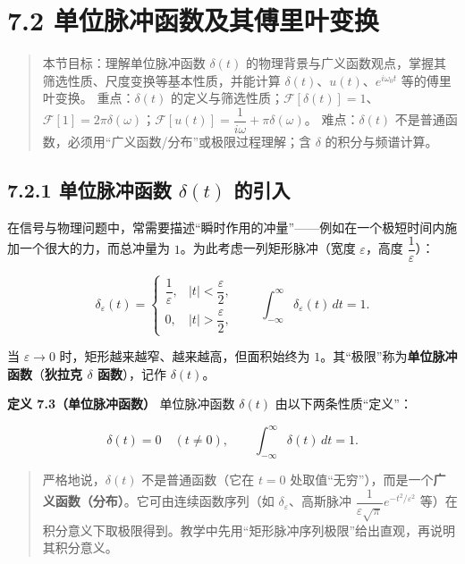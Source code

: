 \section{7.2
单位脉冲函数及其傅里叶变换}\label{ux5355ux4f4dux8109ux51b2ux51fdux6570ux53caux5176ux5085ux91ccux53f6ux53d8ux6362}

\begin{quote}
本节目标：理解单位脉冲函数 \(\delta(t)\)
的物理背景与广义函数观点，掌握其筛选性质、尺度变换等基本性质，并能计算
\(\delta(t)\)、\(u(t)\)、\(e^{i\omega_0 t}\) 等的傅里叶变换。
重点：\(\delta(t)\)
的定义与筛选性质；\(\mathcal F[\delta(t)]=1\)、\(\mathcal F[1]=2\pi\delta(\omega)\)；\(\mathcal F[u(t)]=\dfrac{1}{i\omega}+\pi\delta(\omega)\)。
难点：\(\delta(t)\)
不是普通函数，必须用``广义函数/分布''或极限过程理解；含 \(\delta\)
的积分与频谱计算。
\end{quote}

\subsection{\texorpdfstring{7.2.1 单位脉冲函数 \(\delta(t)\)
的引入}{7.2.1 单位脉冲函数 \textbackslash delta(t) 的引入}}\label{ux5355ux4f4dux8109ux51b2ux51fdux6570-deltat-ux7684ux5f15ux5165}

在信号与物理问题中，常需要描述``瞬时作用的冲量''------例如在一个极短时间内施加一个很大的力，而总冲量为
\(1\)。为此考虑一列矩形脉冲（宽度 \(\varepsilon\)，高度
\(\dfrac{1}{\varepsilon}\)）：

\[
\delta_\varepsilon(t)=
\begin{cases}
\dfrac{1}{\varepsilon}, & |t|<\dfrac{\varepsilon}{2},\\
0, & |t|>\dfrac{\varepsilon}{2},
\end{cases}
\qquad \int_{-\infty}^{\infty}\delta_\varepsilon(t)\,dt=1 .
\]

当 \(\varepsilon\to0\) 时，矩形越来越窄、越来越高，但面积始终为
\(1\)。其``极限''称为\textbf{单位脉冲函数}（\textbf{狄拉克 \(\delta\)
函数}），记作 \(\delta(t)\)。

\textbf{定义 7.3（单位脉冲函数）} 单位脉冲函数 \(\delta(t)\)
由以下两条性质``定义''：

\[
\delta(t)=0\quad (t\neq 0),
\qquad
\int_{-\infty}^{\infty}\delta(t)\,dt=1 .
\]

\begin{quote}
严格地说，\(\delta(t)\) 不是普通函数（它在 \(t=0\)
处取值``无穷''），而是一个\textbf{广义函数（分布）}。它可由连续函数序列（如
\(\delta_\varepsilon\)、高斯脉冲
\(\dfrac{1}{\varepsilon\sqrt{\pi}}e^{-t^2/\varepsilon^2}\)
等）在积分意义下取极限得到。教学中先用``矩形脉冲序列极限''给出直观，再说明其积分意义。
\end{quote}

